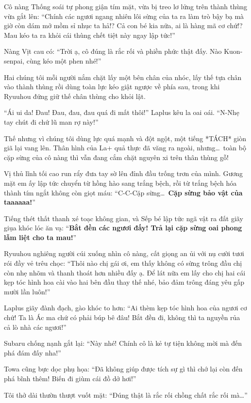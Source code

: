 \documentclass[../main.tex]{subfiles}
\begin{document}
Cô nàng Thống soái tự phong giận tím mặt, vừa bị treo lơ lửng trên thành thùng vừa gắt lên: ``Chính các ngươi ngang nhiên lôi sừng của ta ra làm trò bậy bạ mà giờ còn dám mở mồm sỉ nhục ta hả!? Cả con bé kia nữa, ai là hàng mã cơ chứ!? Mau kéo ta ra khỏi cái thùng chết tiệt này ngay lập tức!''

Nàng Vịt cau có: ``Trời ạ, cô đúng là rắc rối và phiền phức thật đấy. Nào Kuon-senpai, cùng kéo một phen nhé!''

Hai chúng tôi mỗi người nắm chặt lấy một bên chân của nhóc, lấy thế tựa chân vào thành thùng rồi dùng toàn lực kéo giật ngược về phía sau, trong khi Ryuuhou đứng giữ thế chân thùng cho khỏi lật.

``Ái ui da! Đau! Đau, đau, đau quá đi mất thôi!'' Laplus kêu la oai oái. ``N-Nhẹ tay chút đi chứ lũ man rợ này!''

Thế nhưng vì chúng tôi dùng lực quá mạnh và đột ngột, một tiếng *TÁCH* giòn giã lại vang lên. Thân hình của La+ quả thực đã văng ra ngoài, nhưng\dots\ toàn bộ cặp sừng của cô nàng thì vẫn đang cắm chặt nguyên xi trên thân thùng gỗ!

Vị thủ lĩnh tối cao run rẩy đưa tay sờ lên đỉnh đầu trống trơn của mình. Gương mặt em ấy lập tức chuyển từ hồng hào sang trắng bệch, rồi từ trắng bệch hóa thành tím ngắt không còn giọt máu: ``C-C-Cặp sừng\dots\ \textbf{Cặp sừng bảo vật của taaaaaa!}''

Tiếng thét thất thanh xé toạc không gian, và Sếp bé lập tức ngã vật ra đất giãy giụa khóc lóc ăn vạ: ``\textbf{Bắt đền các ngươi đấy! Trả lại cặp sừng oai phong lẫm liệt cho ta mau!}''

Ryuuhou nghiêng người cúi xuống nhìn cô nàng, cất giọng an ủi với nụ cười tươi rói đầy vẻ trêu chọc: ``Thôi nào chị gái ơi, em thấy không có sừng trông đầu chị còn nhẹ nhõm và thanh thoát hơn nhiều đấy ạ. Để lát nữa em lấy cho chị hai cái kẹp tóc hình hoa cài vào hai bên đầu thay thế nhé, bảo đảm trông đáng yêu gấp mười lần luôn!''

Laplus giãy đành đạch, gào khóc to hơn: ``Ai thèm kẹp tóc hình hoa của ngươi cơ chứ! Ta là Ác ma chứ có phải búp bê đâu! Bắt đền đi, không thì ta nguyền rủa cả lò nhà các ngươi!''

Subaru chống nạnh gắt lại: ``Này nhé! Chính cô là kẻ tự tiện không mời mà đến phá đám đấy nha!''

Towa cũng bực dọc phụ họa: ``Đã không giúp được tích sự gì thì chớ lại còn đến phá bĩnh thêm! Biến đi giùm cái đồ dở hơi!''

Tôi thở dài thườn thượt vuốt mặt: ``Đúng thật là rắc rối chồng chất rắc rối mà\dots''
\end{document}
